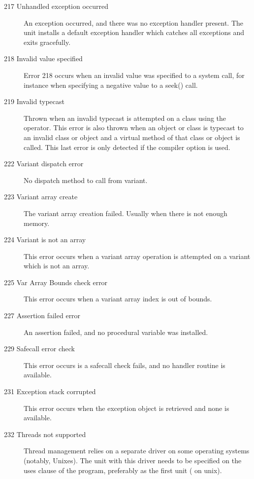\begin{description}
\item [217 Unhandled exception occurred]
An exception occurred, and there was no exception handler present.
The  unit installs a default exception handler which catches
all exceptions and exits gracefully.

\item[218 Invalid value specified]
Error 218 occurs when an invalid value was specified to a system call,
for instance when specifying a negative value to a seek() call.

\item [219 Invalid typecast]

Thrown when an invalid typecast is attempted on a class using the 
operator. This error is also thrown when an object or class is
typecast to an invalid class or object and a virtual method of
that class or object is called. This last error is only detected
if the  compiler option is used.


\item[222 Variant dispatch error]
No dispatch method to call from variant.

\item[223 Variant array create]
The variant array creation failed. Usually when there is not enough memory.

\item[224 Variant is not an array]
This error occurs when a variant array operation is attempted on a variant
which is not an array.

\item[225 Var Array Bounds check error]
This error occurs when a variant array index is out of bounds.

\item [227 Assertion failed error]
An assertion failed, and no  procedural variable was
installed.

\item [229 Safecall error check]
This error occurs is a safecall check fails, and no handler routine is
available.

\item [231 Exception stack corrupted]
This error occurs when the exception object is retrieved and none is
available.

\item [232 Threads not supported]
Thread management relies on a separate driver on some operating systems
(notably, Unixes). The unit with this driver needs to be specified on
the uses clause of the program, preferably as the first unit
( on unix).

\end{description}

